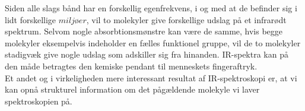 Siden alle slags bånd har en forskellig egenfrekvens, i og med at de befinder sig i lidt forskellige $miljøer$, vil to molekyler give forskellige udslag på et infrarødt spektrum. Selvom nogle absorbtionsmønstre kan være de samme, hvis begge molekyler eksempelvis indeholder en fælles funktionel gruppe, vil de to molekyler stadigvæk give nogle udslag som adskiller sig fra hinanden. IR-spektra kan på den måde betragtes den kemiske pendant til menneskets fingeraftryk.  \\

Et andet og i virkeligheden mere interessant resultat af IR-spektroskopi er, at vi kan opnå strukturel information om det pågældende molekyle vi laver spektroskopien på. 


